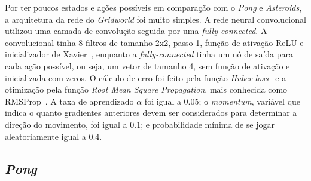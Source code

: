 Por ter poucos estados e ações possíveis em comparação com o \textit{Pong} e \textit{Asteroids}, a arquitetura da rede do \textit{Gridworld} foi muito simples.
A rede neural convolucional utilizou uma camada de convolução seguida por uma \textit{fully-connected}.
A convolucional tinha 8 filtros de tamanho 2x2, passo 1, função de ativação ReLU e inicializador de Xavier~\cite{pmlr-v9-glorot10a}, enquanto a \textit{fully-connected} tinha um nó de saída para cada ação possível, ou seja, um vetor de tamanho 4, sem função de ativação e inicializada com zeros.
O cálculo de erro foi feito pela função \textit{Huber loss}~\cite{huber_loss} e a otimização pela função \textit{Root Mean Square Propagation}, mais conhecida como RMSProp~\cite{rmsprop}.
A taxa de aprendizado $\alpha$ foi igual a $0.05$; o \textit{momentum}, variável que indica o quanto gradientes anteriores devem ser considerados para determinar a direção do movimento, foi igual a $0.1$; e probabilidade mínima de se jogar aleatoriamente igual a $0.4$.

\subsection{\textit{Pong}}
\label{sec:arq_pong}

